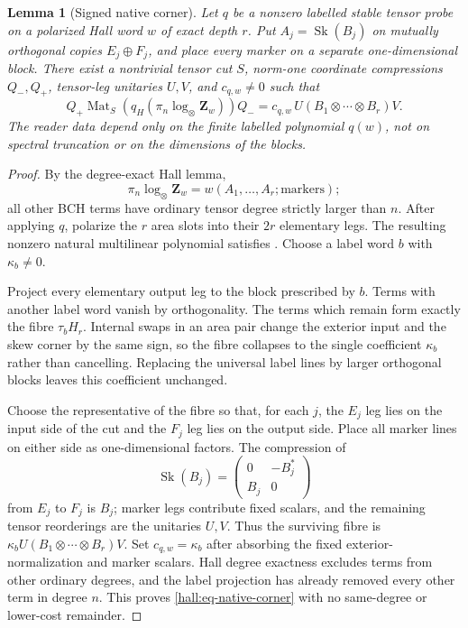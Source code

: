 \documentclass[10pt,reqno]{amsart}
\theoremstyle{plain}
\newtheorem{lemma}[theorem]{Lemma}
\theoremstyle{definition}
\theoremstyle{remark}
\begin{document}
\begin{lemma}[Signed native corner]
\label{hall:lem-signed-corner}
Let $q$ be a nonzero labelled stable tensor probe on a polarized Hall word
$w$ of exact depth $r$.  Put $A_j=\operatorname{Sk}(B_j)$ on mutually
orthogonal copies $E_j\oplus F_j$, and place every marker on a separate
one-dimensional block.  There exist a nontrivial tensor cut $S$, norm-one
coordinate compressions $Q_-,Q_+$, tensor-leg unitaries $U,V$, and
$c_{q,w}\ne0$ such that
\begin{equation}
 Q_+\operatorname{Mat}_S\!\left(
 q_H(\pi_n\log_\otimes\mathbf Z_w)\right)Q_-
 =c_{q,w}\,U(B_1\otimes\cdots\otimes B_r)V.
 \label{hall:eq-native-corner}
\end{equation}
The reader data depend only on the finite labelled polynomial $q(w)$, not on
spectral truncation or on the dimensions of the blocks.
\end{lemma}

\begin{proof}
By the degree-exact Hall lemma,
\[
 \pi_n\log_\otimes\mathbf Z_w=w(A_1,\ldots,A_r;\text{markers});
\]
all other BCH terms have ordinary tensor degree strictly larger than $n$.
After applying $q$, polarize the $r$ area slots into their $2r$ elementary
legs.  The resulting nonzero natural multilinear polynomial satisfies
.  Choose a label word $b$ with
$\kappa_b\ne0$.

Project every elementary output leg to the block prescribed by $b$.  Terms
with another label word vanish by orthogonality.  The terms which remain form
exactly the fibre $\tau_bH_r$.  Internal swaps in an area pair change the
exterior input and the skew corner by the same sign, so the fibre collapses
to the single coefficient $\kappa_b$ rather than cancelling.  Replacing the
universal label lines by larger orthogonal blocks leaves this coefficient
unchanged.

Choose the representative of the fibre so that, for each $j$, the $E_j$ leg
lies on the input side of the cut and the $F_j$ leg lies on the output side.
Place all marker lines on either side as one-dimensional factors.  The
compression of
\[
 \operatorname{Sk}(B_j)=
 \begin{pmatrix}0&-B_j^*\\ B_j&0\end{pmatrix}
\]
from $E_j$ to $F_j$ is $B_j$; marker legs contribute fixed scalars, and the
remaining tensor reorderings are the unitaries $U,V$.  Thus the surviving
fibre is
$\kappa_bU(B_1\otimes\cdots\otimes B_r)V$.  Set
$c_{q,w}=\kappa_b$ after absorbing the fixed exterior-normalization and marker
scalars.  Hall degree exactness excludes terms from other ordinary degrees,
and the label projection has already removed every other term in degree $n$.
This proves \eqref{hall:eq-native-corner} with no same-degree or lower-cost
remainder.
\end{proof}
\end{document}
